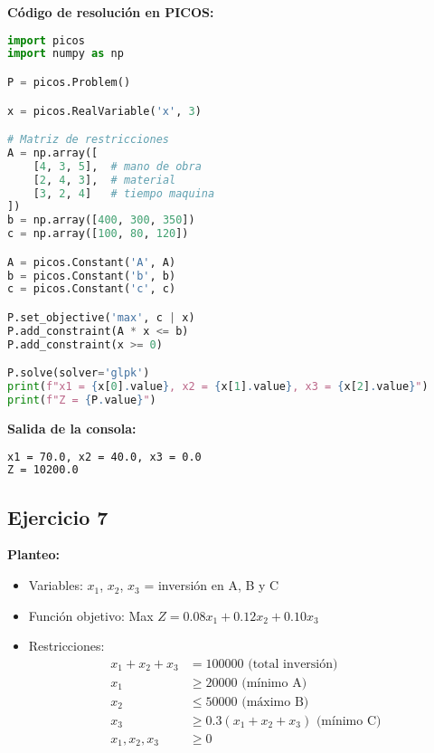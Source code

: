 \documentclass[12pt]{article}
\begin{document}
\textbf{Código de resolución en PICOS:}
\begin{lstlisting}[language=Python]
import picos
import numpy as np

P = picos.Problem()

x = picos.RealVariable('x', 3)

# Matriz de restricciones
A = np.array([
    [4, 3, 5],  # mano de obra
    [2, 4, 3],  # material
    [3, 2, 4]   # tiempo maquina
])
b = np.array([400, 300, 350])
c = np.array([100, 80, 120])

A = picos.Constant('A', A)
b = picos.Constant('b', b)
c = picos.Constant('c', c)

P.set_objective('max', c | x)
P.add_constraint(A * x <= b)
P.add_constraint(x >= 0)

P.solve(solver='glpk')
print(f"x1 = {x[0].value}, x2 = {x[1].value}, x3 = {x[2].value}")
print(f"Z = {P.value}")
\end{lstlisting}

\textbf{Salida de la consola:}
\begin{lstlisting}[language=bash,backgroundcolor=\color{black},basicstyle=\color{white}\ttfamily,numbers=none]
x1 = 70.0, x2 = 40.0, x3 = 0.0
Z = 10200.0
\end{lstlisting}

\subsection*{Ejercicio 7}

\textbf{Planteo:}
\begin{itemize}
\item Variables: $x_1$, $x_2$, $x_3$ = inversión en A, B y C
\item Función objetivo: Max $Z = 0.08x_1 + 0.12x_2 + 0.10x_3$
\item Restricciones:
  \begin{align*}
  x_1 + x_2 + x_3 &= 100000 \text{ (total inversión)} \\
  x_1 &\geq 20000 \text{ (mínimo A)} \\
  x_2 &\leq 50000 \text{ (máximo B)} \\
  x_3 &\geq 0.3(x_1 + x_2 + x_3) \text{ (mínimo C)} \\
  x_1, x_2, x_3 &\geq 0
  \end{align*}
\end{itemize}
\end{document}
